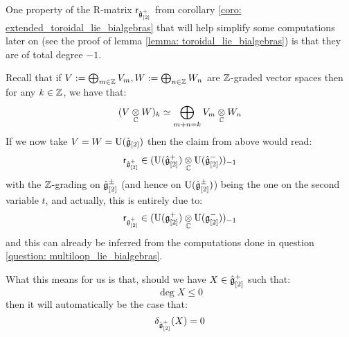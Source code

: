            \begin{remark} \label{remark: total_degrees_of_classical_yangian_R_matrices}
                One property of the R-matrix $\mathsf{r}_{\hat{\mathfrak{g}}_{[2]}^+}$ from corollary \ref{coro: extended_toroidal_lie_bialgebras} that will help simplify some computations later on (see the proof of lemma \ref{lemma: toroidal_lie_bialgebras}) is that they are of total degree $-1$. 

                Recall that if $V := \bigoplus_{m \in \mathbb{Z}} V_m, W := \bigoplus_{n \in \mathbb{Z}} W_n$ are $\mathbb{Z}$-graded vector spaces then for any $k \in \mathbb{Z}$, we have that:
                    $$(V \tensor_{\bbC} W)_k \cong \bigoplus_{m + n = k} V_m \tensor_{\bbC} W_n$$
                If we now take $V = W = \mathrm{U}(\hat{\mathfrak{g}}_{[2]})$ then the claim from above would read:
                    $$\sfr_{\hat{\g}_{[2]}^+} \in ( \rmU(\hat{\g}_{[2]}^+) \tensor_{\bbC} \rmU(\hat{\g}_{[2]}^-) )_{-1}$$
                with the $\mathbb{Z}$-grading on $\hat{\mathfrak{g}}_{[2]}^{\pm}$ (and hence on $\mathrm{U}(\hat{\mathfrak{g}}_{[2]}^{\pm})$) being the one on the second variable $t$, and actually, this is entirely due to:
                    $$\sfr_{\g_{[2]}^+} \in ( \rmU(\g_{[2]}^+) \tensor_{\bbC} \rmU(\g_{[2]}^-) )_{-1}$$
                and this can already be inferred from the computations done in question \ref{question: multiloop_lie_bialgebras}.

                What this means for us is that, should we have $X \in \hat{\mathfrak{g}}_{[2]}^+$ such that:
                    $$\deg X \leq 0$$
                then it will automatically be the case that:
                    $$\delta_{\hat{\mathfrak{g}}_{[2]}^+}(X) = 0$$
            \end{remark}

